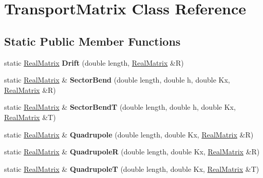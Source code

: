 \hypertarget{classTransportMatrix}{}\section{Transport\+Matrix Class Reference}
\label{classTransportMatrix}
\subsection*{Static Public Member Functions}
\begin{DoxyCompactItemize}
\item 
\mbox{\label{classTransportMatrix_a5fc52b7e67077e54d8b355b1dab3c800}} 
static \hyperlink{classTLAS_1_1Matrix}{Real\+Matrix} {\bfseries Drift} (double length, \hyperlink{classTLAS_1_1Matrix}{Real\+Matrix} \&R)
\item 
\mbox{\label{classTransportMatrix_a49dc577054cc9e8e659f3715900262ea}} 
static \hyperlink{classTLAS_1_1Matrix}{Real\+Matrix} \& {\bfseries Sector\+Bend} (double length, double h, double Kx, \hyperlink{classTLAS_1_1Matrix}{Real\+Matrix} \&R)
\item 
\mbox{\label{classTransportMatrix_a07320b837fa04a771db557ca8de3fdbd}} 
static \hyperlink{classTLAS_1_1Matrix}{Real\+Matrix} \& {\bfseries Sector\+BendT} (double length, double h, double Kx, \hyperlink{classTLAS_1_1Matrix}{Real\+Matrix} \&T)
\item 
\mbox{\label{classTransportMatrix_a48e7f1ec30e63d397c0f3f0829a3cd2f}} 
static \hyperlink{classTLAS_1_1Matrix}{Real\+Matrix} \& {\bfseries Quadrupole} (double length, double Kx, \hyperlink{classTLAS_1_1Matrix}{Real\+Matrix} \&R)
\item 
\mbox{\label{classTransportMatrix_afc2065d536f59f0afbe8306d5ddc7b3c}} 
static \hyperlink{classTLAS_1_1Matrix}{Real\+Matrix} \& {\bfseries QuadrupoleR} (double length, double Kx, \hyperlink{classTLAS_1_1Matrix}{Real\+Matrix} \&R)
\item 
\mbox{\label{classTransportMatrix_ad632b271c3e23f563948d0e03e9fea42}} 
static \hyperlink{classTLAS_1_1Matrix}{Real\+Matrix} \& {\bfseries QuadrupoleT} (double length, double Kx, \hyperlink{classTLAS_1_1Matrix}{Real\+Matrix} \&T)

\end{DoxyCompactItemize}
